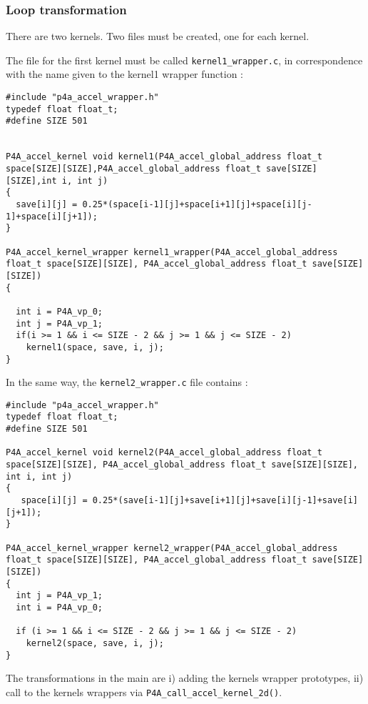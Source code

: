 \documentclass[a4paper]{article}
\begin{document}
\subsubsection{Loop transformation}

There are two kernels. Two files must be created, one for each kernel.


The file for the first kernel must be called
\texttt{kernel1\_wrapper.c}, in correspondence with the name given to
the kernel1 wrapper function :

\begin{lstlisting}
#include "p4a_accel_wrapper.h"
typedef float float_t;
#define SIZE 501


P4A_accel_kernel void kernel1(P4A_accel_global_address float_t space[SIZE][SIZE],P4A_accel_global_address float_t save[SIZE][SIZE],int i, int j) 
{ 
  save[i][j] = 0.25*(space[i-1][j]+space[i+1][j]+space[i][j-1]+space[i][j+1]);
}

P4A_accel_kernel_wrapper kernel1_wrapper(P4A_accel_global_address float_t space[SIZE][SIZE], P4A_accel_global_address float_t save[SIZE][SIZE])
{
    
  int i = P4A_vp_0;
  int j = P4A_vp_1;
  if(i >= 1 && i <= SIZE - 2 && j >= 1 && j <= SIZE - 2)
    kernel1(space, save, i, j);
}
\end{lstlisting}

In the same way, the \texttt{kernel2\_wrapper.c} file contains :

\begin{lstlisting}
#include "p4a_accel_wrapper.h"
typedef float float_t;
#define SIZE 501

P4A_accel_kernel void kernel2(P4A_accel_global_address float_t space[SIZE][SIZE], P4A_accel_global_address float_t save[SIZE][SIZE], int i, int j)
{
   space[i][j] = 0.25*(save[i-1][j]+save[i+1][j]+save[i][j-1]+save[i][j+1]);
}

P4A_accel_kernel_wrapper kernel2_wrapper(P4A_accel_global_address float_t space[SIZE][SIZE], P4A_accel_global_address float_t save[SIZE][SIZE])
{
  int j = P4A_vp_1;
  int i = P4A_vp_0;

  if (i >= 1 && i <= SIZE - 2 && j >= 1 && j <= SIZE - 2)
    kernel2(space, save, i, j);
}
\end{lstlisting}

The transformations in the main are i) adding the kernels wrapper prototypes, ii) call to the kernels wrappers via \texttt{P4A\_call\_accel\_kernel\_2d()}.
\end{document}
